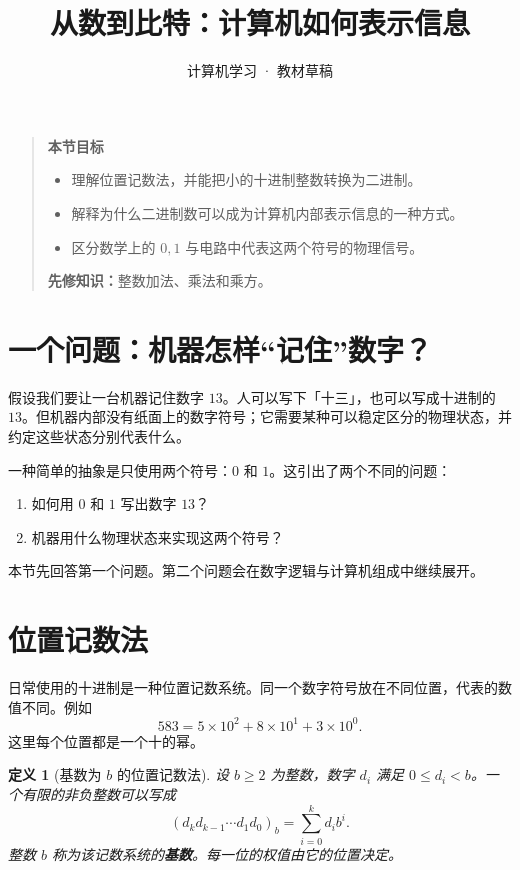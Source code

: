 \documentclass[12pt,a4paper]{ctexart}
\title{从数到比特：计算机如何表示信息}
\author{计算机学习 · 教材草稿}
\date{}
\newtheorem{definition}{定义}
\begin{document}
\maketitle

\begin{quote}
\textbf{本节目标}
\begin{itemize}
    \item 理解位置记数法，并能把小的十进制整数转换为二进制。
    \item 解释为什么二进制数可以成为计算机内部表示信息的一种方式。
    \item 区分数学上的 $0,1$ 与电路中代表这两个符号的物理信号。
\end{itemize}
\textbf{先修知识：}整数加法、乘法和乘方。
\end{quote}

\section{一个问题：机器怎样“记住”数字？}

假设我们要让一台机器记住数字 $13$。人可以写下「十三」，也可以写成十进制的 $13$。但机器内部没有纸面上的数字符号；它需要某种可以稳定区分的物理状态，并约定这些状态分别代表什么。

一种简单的抽象是只使用两个符号：$0$ 和 $1$。这引出了两个不同的问题：
\begin{enumerate}
    \item 如何用 $0$ 和 $1$ 写出数字 $13$？
    \item 机器用什么物理状态来实现这两个符号？
\end{enumerate}

本节先回答第一个问题。第二个问题会在数字逻辑与计算机组成中继续展开。

\section{位置记数法}

日常使用的十进制是一种位置记数系统。同一个数字符号放在不同位置，代表的数值不同。例如
\[
    583 = 5\times 10^2 + 8\times 10^1 + 3\times 10^0.
\]
这里每个位置都是一个十的幂。

\begin{definition}[基数为 $b$ 的位置记数法]
设 $b\ge 2$ 为整数，数字 $d_i$ 满足 $0\le d_i<b$。一个有限的非负整数可以写成
\[
    (d_kd_{k-1}\cdots d_1d_0)_b
    =\sum_{i=0}^{k} d_i b^i.
\]
整数 $b$ 称为该记数系统的\textbf{基数}。每一位的权值由它的位置决定。
\end{definition}
\end{document}

